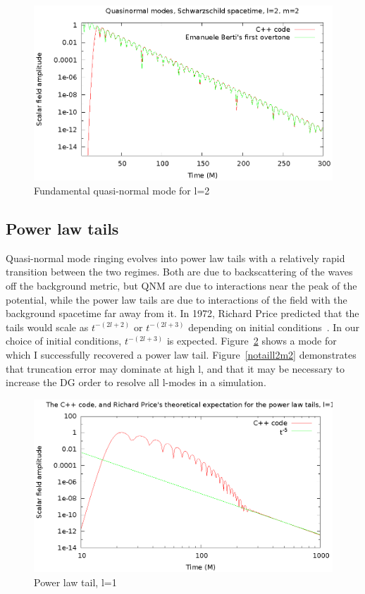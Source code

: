 \begin{figure}
  \includegraphics{l2m2qnm}
  \caption{Fundamental quasi-normal mode for l=2}
  \label{qnml2m2}
\end{figure}


\subsection{Power law tails}

Quasi-normal mode ringing evolves into power law tails with a relatively rapid transition between the two regimes. Both are due to backscattering of the waves off the background metric, but QNM are due to interactions near the peak of the potential, while the power law tails are due to interactions of the field with the background spacetime far away from it. In 1972, Richard Price predicted that the tails would scale as $t^{-(2l+2)}$ or $t^{-(2l+3)}$ depending on initial conditions~\cite{PriceTails}. In our choice of initial conditions, $t^{-(2l+3)}$ is expected. Figure~\ref{taill1m1} shows a mode for which I successfully recovered a power law tail. Figure~\ref{notaill2m2} demonstrates that truncation error may dominate at high l, and that it may be necessary to increase the DG order to resolve all l-modes in a simulation.

\begin{figure}
  \includegraphics{l1m1tail2}
  \caption{Power law tail, l=1}
  \label{taill1m1}
\end{figure}

